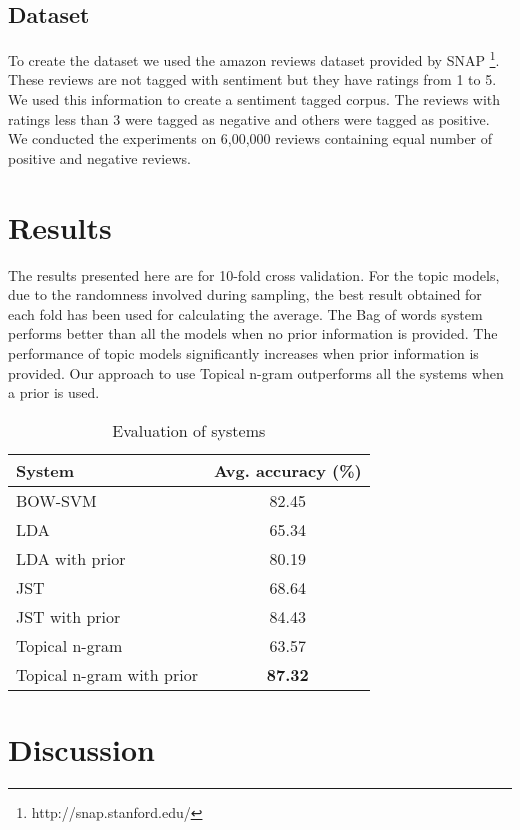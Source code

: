 \documentclass[11pt]{article}
\begin{document}
\subsection*{Dataset}

To create the dataset we used the amazon reviews dataset provided by SNAP \footnote{http://snap.stanford.edu/}.
These reviews are not tagged with sentiment but they have ratings from 1 to 5. We used this information to create
a sentiment tagged corpus. The reviews with ratings less than 3 were tagged as negative and others were tagged
as positive. We conducted the experiments on 6,00,000 reviews containing equal number of positive and negative
reviews.

\section{Results}\label{results}

The results presented here are for 10-fold cross validation. For the topic models, due to the randomness involved 
during sampling, the best result obtained for each fold has been used for calculating the average. The Bag of words 
system performs better than all the models when no prior information is provided. The performance of topic models 
significantly increases when prior information is provided. Our approach to use Topical n-gram outperforms all the 
systems when a prior is used.

\begin{table}[h]
\begin{center}
\begin{tabular}{|l|c|}
\hline \bf System & \bf Avg. accuracy (\%)\\ \hline
BOW-SVM & 82.45\\
LDA & 65.34\\
LDA with prior & 80.19\\
JST & 68.64\\
JST with prior & 84.43\\
Topical n-gram & 63.57\\
Topical n-gram with prior & \textbf{87.32}\\
\hline
\end{tabular}
\end{center}
\caption{\label{result-table} Evaluation of systems}
\end{table}

\section{Discussion}\label{discussion}
\end{document}
